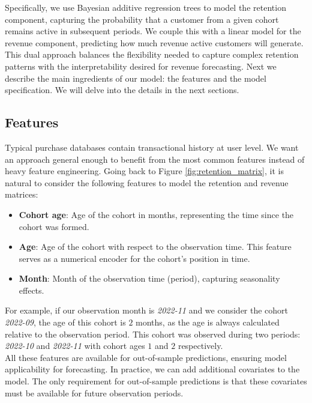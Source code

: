 \documentclass[11pt]{amsart}
\theoremstyle{definition}
\begin{document}
Specifically, we use Bayesian additive regression trees to model the retention component, capturing the probability that a
customer from a given cohort remains active in subsequent periods. We couple this with a linear model for the revenue
component, predicting how much revenue active customers will generate. This dual approach balances the flexibility needed to
capture complex retention patterns with the interpretability desired for revenue forecasting. Next we describe the main
ingredients of our model: the features and the model specification. We will delve into the details in the next sections.

\subsection*{Features}

Typical purchase databases contain transactional history at user level. We want an approach general enough to benefit
from the most common features instead of heavy feature engineering. Going back to Figure \ref{fig:retention_matrix}, it
is natural to consider the following features to model the retention and revenue matrices:

\begin{itemize}
    \item {\bf Cohort age}: Age of the cohort in months, representing the time since the cohort was formed.
    \item {\bf Age}: Age of the cohort with respect to the observation time.
          This feature serves as a numerical encoder for the cohort's position in time.
    \item {\bf Month}: Month of the observation time (period), capturing seasonality effects.
\end{itemize}

For example, if our observation month is {\em 2022-11} and we consider the cohort {\em 2022-09}, the age of this cohort
is $2$ months, as the age is always calculated relative to the observation period. This cohort was observed during two
periods: {\em 2022-10} and {\em 2022-11} with cohort ages $1$ and $2$ respectively. \\

All these features are available for out-of-sample predictions, ensuring model applicability for forecasting.
In practice, we can add additional covariates to the model. The only requirement for out-of-sample predictions is that
these covariates must be available for future observation periods.
\end{document}
